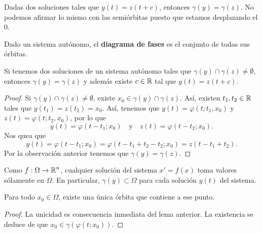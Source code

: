 \begin{observation}
Dadas dos soluciones tales que $\displaystyle y\left(t\right)=z\left(t + c\right) $, entonces $\displaystyle \gamma\left(y\right)=\gamma\left(z\right) $. No podemos afirmar lo mismo con las semiórbitas puesto que estamos desplazando el 0. 
\end{observation}
\begin{definition}
Dado un sistema autónomo, el \textbf{diagrama de fases} es el conjunto de todas sus órbitas. 
\end{definition}
\begin{lema}
Si tenemos dos soluciones de un sistema autónomo tales que $\displaystyle \gamma\left(y\right)\cap \gamma\left(z\right)\neq \emptyset $, entonces $\displaystyle \gamma\left(y\right)=\gamma\left(z\right) $ y además existe $\displaystyle c \in \mathbb{R} $ tal que $\displaystyle y\left(t\right)=z\left(t + c\right) $. 
\end{lema}
\begin{proof}
Si $\displaystyle \gamma\left(y\right)\cap \gamma\left(z\right)\neq \emptyset $, existe $\displaystyle x_{0}\in \gamma\left(y\right)\cap \gamma\left(z\right) $. Así, existen $\displaystyle t_{1}, t_{2}\in \mathbb{R} $ tales que $\displaystyle y\left(t_{1}\right)=z\left(t_{2}\right)=x_{0} $. Así, tenemos que $\displaystyle y\left(t\right)=\varphi\left(t; t_{1}, x_{0}\right) $ y $\displaystyle z\left(t\right)=\varphi\left(t; t_{2}, x_{0}\right) $, por lo que 
\[y\left(t\right)=\varphi\left(t-t_{1}; x_{0}\right) \quad \text{y} \quad z\left(t\right)=\varphi\left(t-t_{2}; x_{0}\right) .\]
Nos quea que 
\[y\left(t\right)=\varphi\left(t-t_{1}; x_{0}\right)=\varphi\left(t-t_{1}+t_{2}-t_{2}; x_{0}\right)=z\left(t-t_{1}+t_{2}\right) .\]
Por la observación anterior tenemos que $\displaystyle \gamma\left(y\right)=\gamma\left(z\right) $. 
\end{proof}
\begin{observation}
Como $\displaystyle f : \Omega \to \mathbb{R}^{n} $, cualquier solución del sistema $\displaystyle x' = f\left(x\right) $ toma valores sólamente en $\displaystyle \Omega  $. En particular, $\displaystyle \gamma\left(y\right)\subset \Omega  $ para cada solución $\displaystyle y\left(t\right) $ del sistema. 
\end{observation}
\begin{colorary}
Para todo $\displaystyle x_{0}\in \Omega  $, existe una única órbita que contiene a ese punto.
\end{colorary}
\begin{proof}
La unicidad es consecuencia inmediata del lema anterior. La existencia se deduce de que $\displaystyle x_{0}\in \gamma\left(\varphi\left(t; x_{0}\right)\right) $. 
\end{proof}
